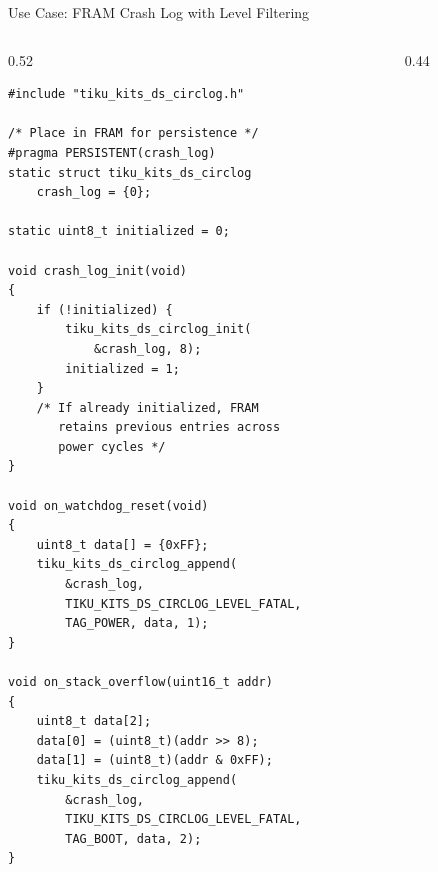 \documentclass[aspectratio=169, 10pt]{beamer}
\begin{document}
\begin{frame}[fragile]{Use Case: FRAM Crash Log with Level Filtering}
\begin{columns}[T]
\begin{column}{0.52\textwidth}
\begin{lstlisting}[style=cstyle,
  title={Persistent crash log in FRAM}]
#include "tiku_kits_ds_circlog.h"

/* Place in FRAM for persistence */
#pragma PERSISTENT(crash_log)
static struct tiku_kits_ds_circlog
    crash_log = {0};

static uint8_t initialized = 0;

void crash_log_init(void)
{
    if (!initialized) {
        tiku_kits_ds_circlog_init(
            &crash_log, 8);
        initialized = 1;
    }
    /* If already initialized, FRAM
       retains previous entries across
       power cycles */
}

void on_watchdog_reset(void)
{
    uint8_t data[] = {0xFF};
    tiku_kits_ds_circlog_append(
        &crash_log,
        TIKU_KITS_DS_CIRCLOG_LEVEL_FATAL,
        TAG_POWER, data, 1);
}

void on_stack_overflow(uint16_t addr)
{
    uint8_t data[2];
    data[0] = (uint8_t)(addr >> 8);
    data[1] = (uint8_t)(addr & 0xFF);
    tiku_kits_ds_circlog_append(
        &crash_log,
        TIKU_KITS_DS_CIRCLOG_LEVEL_FATAL,
        TAG_BOOT, data, 2);
}
\end{lstlisting}
\end{column}

\begin{column}{0.44\textwidth}
\begin{center}
\end{center}
\end{column}
\end{columns}
\end{frame}
\end{document}
